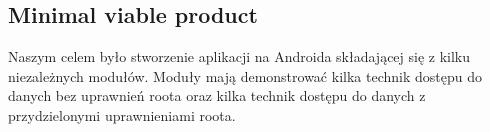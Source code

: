 \subsection{Minimal viable product}
Naszym celem było stworzenie aplikacji na Androida składającej się z kilku niezależnych modułów.
Moduły mają demonstrować kilka technik dostępu do danych bez uprawnień roota oraz kilka technik dostępu do danych z
przydzielonymi uprawnieniami roota.
